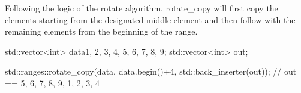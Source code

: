 

Following the logic of the rotate algorithm, rotate\_copy will first copy the elements starting from the designated middle element and then follow with the remaining elements from the beginning of the range.

\begin{box-note}
\begin{cppcode}
std::vector<int> data{1, 2, 3, 4, 5, 6, 7, 8, 9};
std::vector<int> out;

std::ranges::rotate_copy(data, data.begin()+4, std::back_inserter(out));
// out == { 5, 6, 7, 8, 9, 1, 2, 3, 4 }
\end{cppcode}
\end{box-note}
